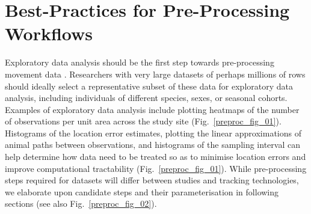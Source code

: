 
\section*{Best-Practices for Pre-Processing Workflows}

Exploratory data analysis should be the first step towards pre-processing movement data \citep[see Fig.~\ref{preproc_fig_01};][]{slingsby2016}.
Researchers with very large datasets of perhaps millions of rows should ideally select a representative subset of these data for exploratory data analysis, including individuals of different species, sexes, or seasonal cohorts.
Examples of exploratory data analysis include plotting heatmaps of the number of observations per unit area across the study site (Fig.~\ref{preproc_fig_01}).
Histograms of the location error estimates, plotting the linear approximations of animal paths between observations, and histograms of the sampling interval can help determine how data need to be treated so as to minimise location errors and improve computational tractability (Fig.~\ref{preproc_fig_01}).
While pre-processing steps required for datasets will differ between studies and tracking technologies, we elaborate upon candidate steps and their parameterisation in following sections (see also Fig.~\ref{preproc_fig_02}).

